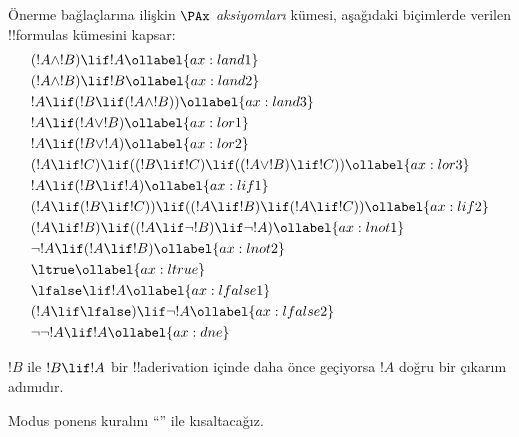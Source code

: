 \documentclass[../../../include/open-logic-section]{subfiles}
\begin{document}
      {}
      {}


\begin{defn}[Aksiyomlar]
Önerme bağlaçlarına ilişkin $\PAx$ \emph{aksiyomları} kümesi, aşağıdaki
biçimlerde verilen !!{formula}s kümesini kapsar:
\begin{align}
  & (!A \land !B) \lif !A \ollabel{ax:land1}\\
  & (!A \land !B) \lif !B \ollabel{ax:land2}\\
  & !A \lif (!B \lif (!A \land !B)) \ollabel{ax:land3}\\
  & !A \lif (!A \lor !B) \ollabel{ax:lor1}\\
  & !A \lif (!B \lor !A) \ollabel{ax:lor2}\\
  & (!A \lif !C) \lif ((!B \lif !C) \lif ((!A \lor !B) \lif !C)) \ollabel{ax:lor3}\\
  & !A \lif (!B \lif !A) \ollabel{ax:lif1}\\
  & (!A \lif (!B \lif !C)) \lif ((!A \lif !B) \lif (!A \lif !C)) \ollabel{ax:lif2}\\
  & (!A \lif !B) \lif ((!A \lif \lnot !B) \lif \lnot !A) \ollabel{ax:lnot1}\\
  & \lnot !A \lif (!A \lif !B) \ollabel{ax:lnot2}\\
  & \ltrue \ollabel{ax:ltrue}\\
  & \lfalse \lif !A \ollabel{ax:lfalse1}\\
  & (!A \lif \lfalse) \lif \lnot !A \ollabel{ax:lfalse2}\\
  & \lnot\lnot !A \lif !A \ollabel{ax:dne}
\end{align}
\end{defn}

\begin{defn}
  $!B$ ile $!B \lif !A$ bir !!a{derivation} içinde daha önce geçiyorsa $!A$
  doğru bir çıkarım adımıdır.
\end{defn}

Modus ponens kuralını ``\MP'' ile kısaltacağız.
\end{document}
